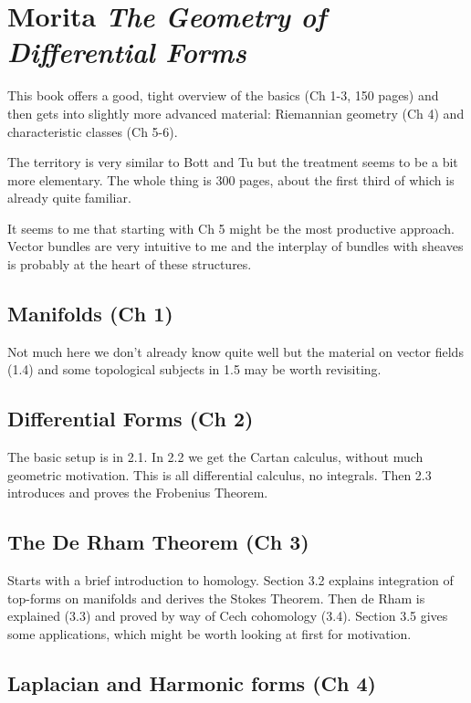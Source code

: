 \documentclass[oneside,english]{amsbook}
\numberwithin{section}{chapter}
\theoremstyle{plain}
\theoremstyle{definition}
\begin{document}
\chapter{Morita \emph{The Geometry of Differential Forms}}

This book offers a good, tight overview of the basics (Ch 1-3, 150 pages) and then gets into slightly more advanced material: Riemannian geometry (Ch 4) and characteristic classes (Ch 5-6). 

The territory is very similar to Bott and Tu but the treatment seems to be a bit more elementary. The whole thing is 300 pages, about the first third of which is already quite familiar.

It seems to me that starting with Ch 5 might be the most productive approach. Vector bundles are very intuitive to me and the interplay of bundles with sheaves is probably at the heart of these structures.

\section{Manifolds (Ch 1)}

Not much here we don't already know quite well but the material on vector fields (1.4) and some topological subjects in 1.5 may be worth revisiting.

\section{Differential Forms (Ch 2)}

The basic setup is in 2.1. In 2.2 we get the Cartan calculus, without much geometric motivation. This is all differential calculus, no integrals. Then 2.3 introduces and proves the Frobenius Theorem.

\section{The De Rham Theorem (Ch 3)}

Starts with a brief introduction to homology. Section 3.2 explains integration of top-forms on manifolds and derives the Stokes Theorem. Then de Rham is explained (3.3) and proved by way of Cech cohomology (3.4). Section 3.5 gives some applications, which might be worth looking at first for motivation.

\section{Laplacian and Harmonic forms (Ch 4)}
\end{document}

